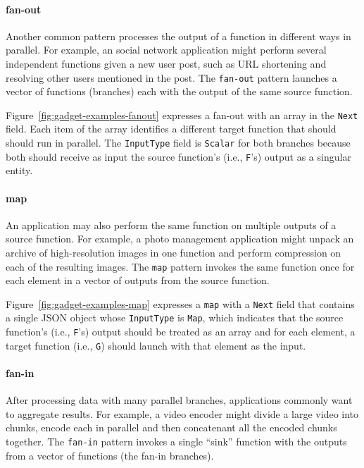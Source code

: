 \paragraph{fan-out}

Another common pattern processes the output of a function in different ways in
parallel. For example, an social network application might perform several
independent functions given a new user post, such as URL shortening and
resolving other users mentioned in the post. The \texttt{fan-out} pattern
launches a vector of functions (branches) each with the output of the same
source function.

Figure~\ref{fig:gadget-examples-fanout} expresses a fan-out with an array in
the \texttt{Next} field. Each item of the array identifies a different target
function that should should run in parallel. The \texttt{InputType} field is
\texttt{Scalar} for both branches because both should receive as input the
source function's (i.e., \texttt{F}'s) output as a singular entity.

\paragraph{map}

An application may also perform the same function on multiple outputs of a
source function. For example, a photo management application might unpack an
archive of high-resolution images in one function and perform compression on
each of the resulting images. The \texttt{map} pattern invokes the same
function once for each element in a vector of outputs from the source
function.

Figure~\ref{fig:gadget-examples-map} expresses a \texttt{map} with a
\texttt{Next} field that contains a single JSON object whose
\texttt{InputType} is \texttt{Map}, which indicates that the source function's
(i.e., \texttt{F}'s) output should be treated as an array and for each
element, a target function (i.e., \texttt{G}) should launch with that element
as the input.

\paragraph{fan-in}

After processing data with many parallel branches, applications commonly want
to aggregate results. For example, a video encoder might divide a large video
into chunks, encode each in parallel and then concatenant all the encoded
chunks together. The \texttt{fan-in} pattern invokes a single ``sink''
function with the outputs from a vector of functions (the fan-in branches).

